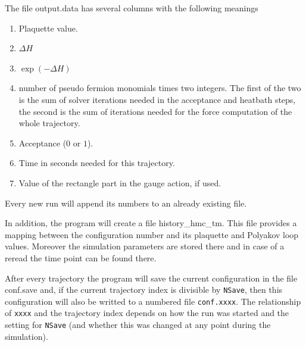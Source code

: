 The file {\ttfamily output.data} has several columns with the
following meanings
\begin{enumerate}
\item Plaquette value.
\item $\Delta H$
\item $\exp(-\Delta H)$
\item number of pseudo fermion monomials times two integers. The first
  of the two is the sum of solver iterations needed
  in the acceptance and heatbath steps, the second is the sum of 
  iterations needed for the force computation of the whole trajectory.
\item Acceptance ($0$ or $1$).
\item Time in seconds needed for this trajectory.
\item Value of the rectangle part in the gauge action, if used.
\end{enumerate}
Every new run will append its numbers to an already existing file.

In addition, the program will create a file {\ttfamily
  history\_hmc\_tm}. This file provides a mapping between the
configuration number and its plaquette and Polyakov loop
values. Moreover the simulation parameters are stored there and in
case of a reread the time point can be found there.

After every trajectory the program will save the current configuration
in the file {\ttfamily conf.save} and, if the current trajectory index
is divisible by \texttt{NSave}, then this configuration will also
be writted to a numbered file \texttt{conf.xxxx}. The relationship
of \texttt{xxxx} and the trajectory index depends on how the run was
started and the setting for \texttt{NSave} (and whether this was changed
at any point during the simulation).

